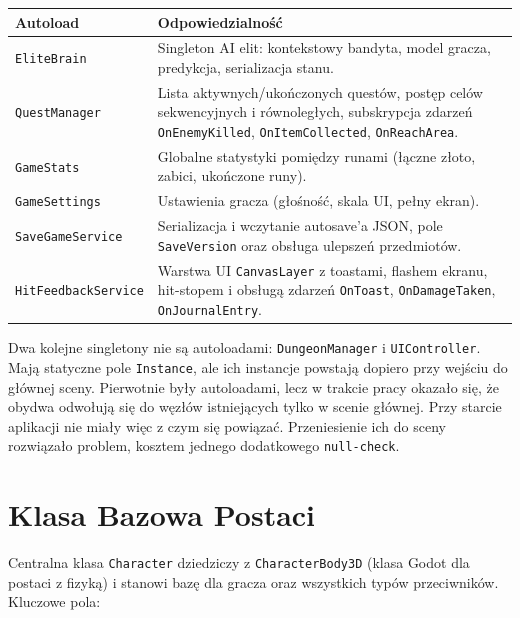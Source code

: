 \begin{center}
\begin{tabular}{|p{}|p{}|}
\hline
\textbf{Autoload} & \textbf{Odpowiedzialność} \\
\hline
\texttt{EliteBrain} & Singleton AI elit: kontekstowy bandyta, model gracza, predykcja, serializacja stanu. \\
\hline
\texttt{QuestManager} & Lista aktywnych/ukończonych questów, postęp celów sekwencyjnych i równoległych, subskrypcja zdarzeń \texttt{OnEnemyKilled}, \texttt{OnItemCollected}, \texttt{OnReachArea}. \\
\hline
\texttt{GameStats} & Globalne statystyki pomiędzy runami (łączne złoto, zabici, ukończone runy). \\
\hline
\texttt{GameSettings} & Ustawienia gracza (głośność, skala UI, pełny ekran). \\
\hline
\texttt{SaveGameService} & Serializacja i wczytanie autosave'a JSON, pole \texttt{SaveVersion} oraz obsługa ulepszeń przedmiotów. \\
\hline
\texttt{HitFeedbackService} & Warstwa UI \texttt{CanvasLayer} z toastami, flashem ekranu, hit-stopem i obsługą zdarzeń \texttt{OnToast}, \texttt{OnDamageTaken}, \texttt{OnJournalEntry}. \\
\hline
\end{tabular}
\end{center}

\noindent
Dwa kolejne singletony nie są autoloadami: \texttt{DungeonManager} i \texttt{UIController}. Mają statyczne pole \texttt{Instance}, ale ich instancje powstają dopiero przy wejściu do głównej sceny. Pierwotnie były autoloadami, lecz w trakcie pracy okazało się, że obydwa odwołują się do węzłów istniejących tylko w scenie głównej. Przy starcie aplikacji nie miały więc z czym się powiązać. Przeniesienie ich do sceny rozwiązało problem, kosztem jednego dodatkowego \texttt{null-check}.

\section{Klasa Bazowa Postaci}

Centralna klasa \texttt{Character} dziedziczy z \texttt{CharacterBody3D} (klasa Godot dla postaci z fizyką) i stanowi bazę dla gracza oraz wszystkich typów przeciwników. Kluczowe pola:

